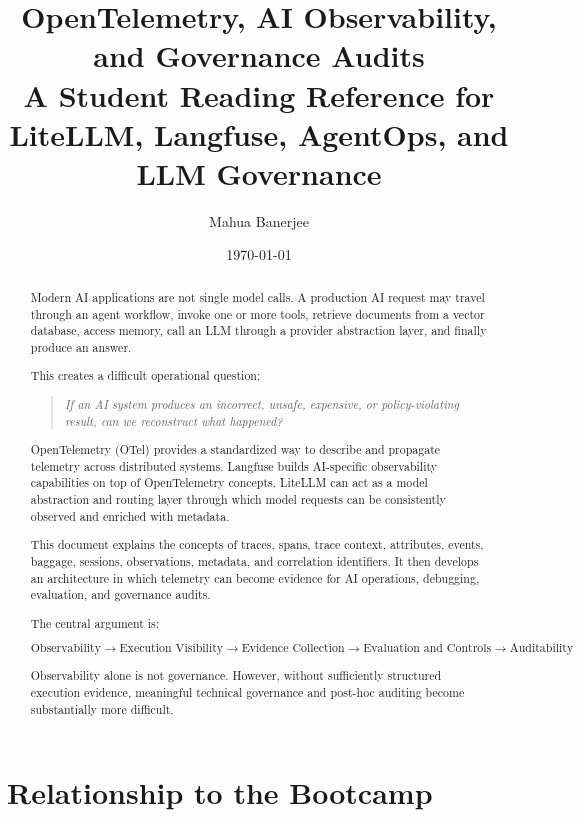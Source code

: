 \documentclass[11pt,a4paper]{article}
\title{
\textbf{OpenTelemetry, AI Observability, and Governance Audits}\\[0.5em]
\large A Student Reading Reference for LiteLLM, Langfuse, AgentOps, and LLM Governance
}
\author{Mahua Banerjee}
\date{\today}
\begin{document}
\maketitle

\begin{abstract}
Modern AI applications are not single model calls. A production AI request may travel through an agent workflow, invoke one or more tools, retrieve documents from a vector database, access memory, call an LLM through a provider abstraction layer, and finally produce an answer.

This creates a difficult operational question:

\begin{quote}
\textit{If an AI system produces an incorrect, unsafe, expensive, or policy-violating result, can we reconstruct what happened?}
\end{quote}

OpenTelemetry (OTel) provides a standardized way to describe and propagate telemetry across distributed systems. Langfuse builds AI-specific observability capabilities on top of OpenTelemetry concepts. LiteLLM can act as a model abstraction and routing layer through which model requests can be consistently observed and enriched with metadata.

This document explains the concepts of traces, spans, trace context, attributes, events, baggage, sessions, observations, metadata, and correlation identifiers. It then develops an architecture in which telemetry can become evidence for AI operations, debugging, evaluation, and governance audits.

The central argument is:

\[
\boxed{
\text{Observability}
\rightarrow
\text{Execution Visibility}
\rightarrow
\text{Evidence Collection}
\rightarrow
\text{Evaluation and Controls}
\rightarrow
\text{Auditability}
}
\]

Observability alone is not governance. However, without sufficiently structured execution evidence, meaningful technical governance and post-hoc auditing become substantially more difficult.
\end{abstract}

\tableofcontents
\newpage

\section{Relationship to the Bootcamp}
\end{document}
